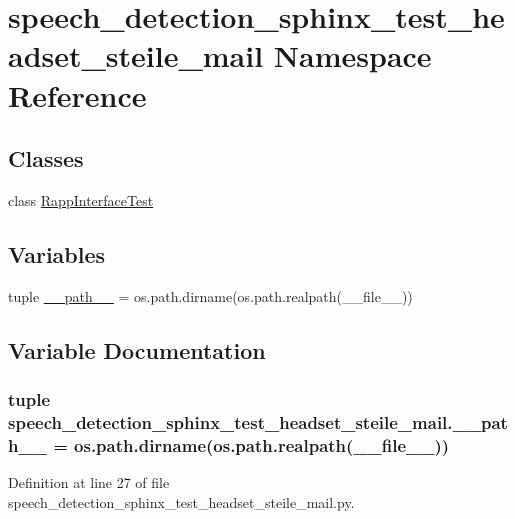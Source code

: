 \hypertarget{namespacespeech__detection__sphinx__test__headset__steile__mail}{\section{speech\-\_\-detection\-\_\-sphinx\-\_\-test\-\_\-headset\-\_\-steile\-\_\-mail Namespace Reference}
\label{namespacespeech__detection__sphinx__test__headset__steile__mail}
}
\subsection*{Classes}
\begin{DoxyCompactItemize}
\item 
class \hyperlink{classspeech__detection__sphinx__test__headset__steile__mail_1_1RappInterfaceTest}{Rapp\-Interface\-Test}
\end{DoxyCompactItemize}
\subsection*{Variables}
\begin{DoxyCompactItemize}
\item 
tuple \hyperlink{namespacespeech__detection__sphinx__test__headset__steile__mail_ae07be02c3c584845a2f56b29e47b0ffa}{\-\_\-\-\_\-path\-\_\-\-\_\-} = os.\-path.\-dirname(os.\-path.\-realpath(\-\_\-\-\_\-file\-\_\-\-\_\-))
\end{DoxyCompactItemize}


\subsection{Variable Documentation}
\hypertarget{namespacespeech__detection__sphinx__test__headset__steile__mail_ae07be02c3c584845a2f56b29e47b0ffa}{
\subsubsection[{\-\_\-\-\_\-path\-\_\-\-\_\-}]{\setlength{\rightskip}{0pt plus 5cm}tuple speech\-\_\-detection\-\_\-sphinx\-\_\-test\-\_\-headset\-\_\-steile\-\_\-mail.\-\_\-\-\_\-path\-\_\-\-\_\- = os.\-path.\-dirname(os.\-path.\-realpath(\-\_\-\-\_\-file\-\_\-\-\_\-))}}\label{namespacespeech__detection__sphinx__test__headset__steile__mail_ae07be02c3c584845a2f56b29e47b0ffa}


Definition at line 27 of file speech\-\_\-detection\-\_\-sphinx\-\_\-test\-\_\-headset\-\_\-steile\-\_\-mail.\-py.

